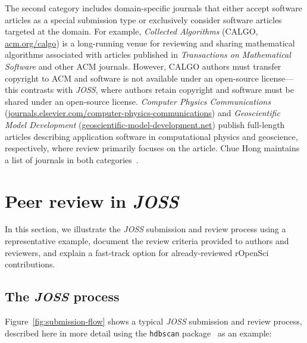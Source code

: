 \documentclass{article}
\newcommand\joss{\textit{JOSS}}
\begin{document}
The second category includes domain-specific journals that either accept software articles as a special submission type or exclusively consider software articles targeted at the domain.
For example, \textit{Collected Algorithms} (CALGO, \href{http://www.acm.org/calgo/}{acm.org/calgo}) is a long-running venue for reviewing and sharing mathematical algorithms associated with articles published in \textit{Transactions on Mathematical Software} and other ACM journals.
However, CALGO authors must transfer copyright to ACM and software is not available under an open-source license---this contrasts with \joss{}, where authors retain copyright and software must be shared under an open-source license.
\textit{Computer Physics Communications} (\href{https://www.journals.elsevier.com/computer-physics-communications}{journals.elsevier.com/computer-physics-communications}) and \textit{Geoscientific Model Development} (\href{https://www.geoscientific-model-development.net/}{geoscientific-model-development.net}) publish full-length articles describing application software in computational physics and geoscience, respectively, where review primarily focuses on the article.
Chue Hong maintains a list of journals in both categories~\cite{software-papers-list}.


\section{Peer review in \joss{}}
\label{thereview}

In this section, we illustrate the \joss{} submission and review process using a representative example, document the review criteria provided to authors and reviewers, and explain a fast-track option for already-reviewed rOpenSci contributions.


\subsection{The \joss{} process}

Figure~\ref{fig:submission-flow} shows a typical \joss{} submission and review process, described here in more detail using the \texttt{hdbscan} package~\cite{McInnes2017} as an example:
\end{document}
